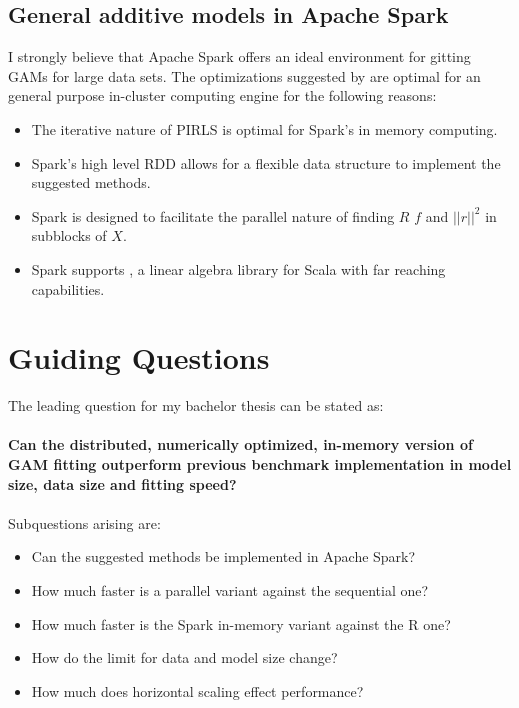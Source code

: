 \documentclass{article}
\begin{document}
    \subsection{General additive models in Apache Spark}
    I strongly believe that Apache Spark offers an ideal environment for gitting GAMs for large data sets. The optimizations suggested by \cite{bigdataGAM} are optimal for an general purpose in-cluster computing engine for the following reasons:
    \begin{itemize}
        \item The iterative nature of PIRLS is optimal for Spark's in memory computing.
        \item Spark's high level RDD allows for a flexible data structure to implement the suggested methods.
        \item Spark is designed to facilitate the parallel nature of finding $R$ $f$ and $||r||^2$ in subblocks of $X$.
        \item Spark supports \cite{Breeze}, a linear algebra library for Scala with far reaching capabilities.
    \end{itemize}

    \section{Guiding Questions}

    The leading question for my bachelor thesis can be stated as:
    \paragraph{Can the distributed, numerically optimized, in-memory version of GAM fitting outperform previous benchmark implementation in model size, data size and fitting speed?}

    \paragraph{}
    Subquestions arising are:
        \begin{itemize}
        \item Can the suggested methods be implemented in Apache Spark?
        \item How much faster is a parallel variant against the sequential one?
        \item How much faster is the Spark in-memory variant against the R one?
        \item How do the limit for data and model size change?
        \item How much does horizontal scaling effect performance?
        \end{itemize}
\end{document}
